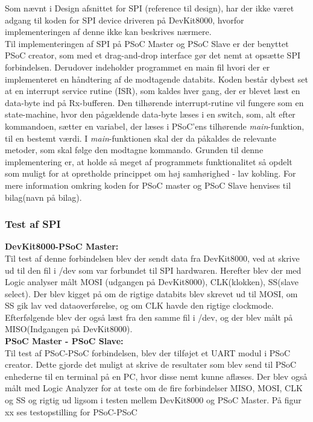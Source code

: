 Som nævnt i Design afsnittet for SPI (reference til design), har der ikke været adgang til koden for SPI device driveren på DevKit8000, hvorfor implementeringen
af denne ikke kan beskrives nærmere. \\

Til implementeringen af SPI på PSoC Master og PSoC Slave er der benyttet PSoC creator, som med et drag-and-drop interface gør det nemt at opsætte SPI forbindelsen. 
Derudover indeholder programmet en main fil hvori der er implementeret en håndtering af de modtagende databits. Koden består dybest set at en interrupt service 
rutine (ISR), som kaldes hver gang, der er blevet læst en data-byte ind på Rx-bufferen. Den tilhørende interrupt-rutine vil fungere som en state-machine, 
hvor den pågældende data-byte læses i en switch, som, alt efter kommandoen, sætter en variabel, der læses i PSoC'ens tilhørende \textit{main}-funktion, til en 
bestemt værdi. I \textit{main}-funktionen skal der da påkaldes de relevante metoder, som skal følge den modtagne kommando. Grunden til denne implementering er, 
at holde så meget af programmets funktionalitet så opdelt som muligt for at opretholde princippet om høj samhørighed - lav kobling. For mere information omkring 
koden for PSoC master og PSoC Slave henvises til bilag(navn på bilag).   


\subsubsection{Test af SPI}

\textbf{DevKit8000-PSoC Master:}\\
Til test af denne forbindelsen blev der sendt data fra DevKit8000, ved at skrive ud til den fil i /dev som var forbundet til SPI hardwaren. Herefter blev der
med Logic analyser målt MOSI (udgangen på DevKit8000), CLK(klokken), SS(slave select). Der blev kigget på om de rigtige databits blev skrevet ud
til MOSI, om SS gik lav ved dataoverførelse, og om CLK havde den rigtige clockmode. Efterfølgende blev der også læst fra den samme fil i /dev, og der blev målt
på MISO(Indgangen på DevKit8000).\\


\textbf{PSoC Master - PSoC Slave:} \\
Til test af PSoC-PSoC forbindelsen, blev der tilføjet et UART modul i PSoC creator. Dette gjorde det muligt at skrive de resultater som blev send til PSoC 
enhederne til en terminal på en PC, hvor disse nemt kunne aflæses. Der blev også målt med Logic Analyzer for at teste om de fire forbindelser MISO, MOSI, CLK 
og SS og rigtig ud ligsom i testen mellem DevKit8000 og PSoC Master. På figur xx ses testopstilling for PSoC-PSoC\\

